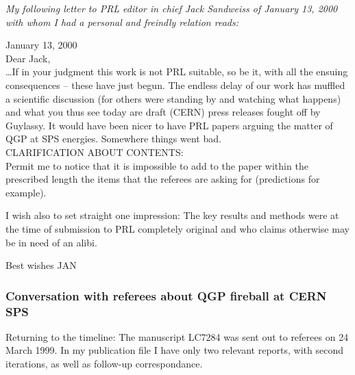 \noindent \textit{My following letter to PRL editor in chief Jack Sandweiss of January 13, 2000 with whom I had a personal and freindly relation reads:}\\[-0.7cm]
%
\begin{mdframed}[linecolor=gray,roundcorner=12pt,backgroundcolor=Dandelion!15,linewidth=1pt,leftmargin=0cm,rightmargin=0cm,topline=true,bottomline=true,skipabove=12pt]\relax%
January 13, 2000\\
Dear Jack,\\

\ldots If in your judgment this work is not PRL suitable, so be it, with all the ensuing consequences -- these have just begun. The endless delay of our work has muffled a scientific discussion (for others were standing by and watching what happens) and what you thus see today are draft (CERN) press releases fought off by Guylassy. It would have been nicer to have PRL papers arguing the matter of QGP at SPS energies. Somewhere things went bad.\\

\small{CLARIFICATION ABOUT CONTENTS:}\\
Permit me to notice that it is impossible to add to the paper within the prescribed length the items that the referees are asking for (predictions for example).

I wish also to set straight one impression: The key results and methods were at the time of submission to PRL completely original and who claims otherwise may be in need of an alibi.

Best wishes JAN
\end{mdframed}

\subsubsection{Conversation with referees about QGP fireball at CERN SPS}
Returning to the timeline: The manuscript LC7284 was sent out to referees on 24 March 1999. In my publication file I have only  two relevant reports, with second iterations, as well as follow-up correspondance.\\

